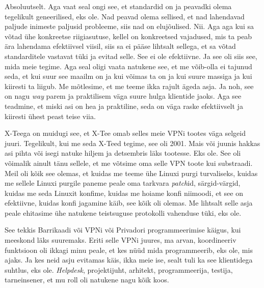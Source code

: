 
Absoluutselt. Aga vaat seal ongi see, et standardid on ja peavadki olema 
tegelikult geneerilised, eks ole. Nad peavad olema sellised, et nad lahendavad 
paljude inimeste paljusid probleeme, siis nad on elujõulised. Nii. Aga aga kui 
sa võtad ühe konkreetse riigiasutuse, kellel on konkreetsed vajadused, mis ta 
peab ära lahendama efektiivsel viisil, siis sa ei pääse lihtsalt sellega, et sa 
võtad standarditele vastavat tüki ja evitad selle. See ei ole efektiivne. Ja 
see oli siis see, mida meie tegime. Aga seal oligi vaata natukene see, et me 
võib-olla ei tajunud seda, et kui suur see maailm on ja kui võimas ta on ja kui 
suure massiga ja kui kiiresti ta liigub. Me mõtlesime, et me teeme ikka rajult 
ägeda asja. Ja noh, see on nagu \emph{way}  parem ja praktilisem väga suure 
hulga klientide jaoks. Aga see teadmine, et miski asi on hea ja praktiline,  
seda on väga raske efektiivselt ja kiiresti ühest peast teise viia.  


X-Teega on muidugi see, et X-Tee omab selles meie VPNi tootes väga selgeid 
juuri. Tegelikult, kui me seda X-Teed tegime, see oli 2001.  Mais või juunis 
hakkas asi pihta või isegi natuke hiljem ja detsembris läks tootesse. Eks ole. 
See oli võimalik ainult tänu sellele, et me võtsime oma selle VPN toote kui 
substraadi. Meil oli kõik see olemas, et kuidas me teeme ühe Linuxi purgi 
turvaliseks, kuidas me sellele  Linuxi purgile paneme peale oma tarkvara 
\emph{patch}id, särgid-värgid, kuidas me seda Linuxit konfime, kuidas me hoiame 
konfi niimoodi, et see on efektiivne, kuidas konfi jagamine käib, see kõik oli 
olemas. Me lihtsalt selle asja peale ehitasime ühe natukene teistsuguse 
protokolli vahenduse tüki, eks ole. 


See tekkis Barrikaadi või VPNi või Privadori 
programmeerimise käigus, kui meeskond läks suuremaks. Eriti selle VPNi juures, 
ma arvan,  koordineeriv funktsioon oli ikkagi minu peale, et kes nüüd mida 
programmeerib, eks ole, mis ajaks. Ja kes neid asju evitamas käis, ikka meie 
ise, sealt tuli ka see klientidega suhtlus, eks ole. \emph{Helpdesk}, 
projektijuht, arhitekt, programmeerija, testija, tarneinsener, et mu roll oli 
natukene nagu kõik koos. 

